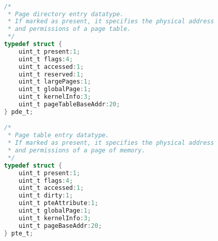 \documentclass[11pt]{article}
\begin{document}
\begin{lstlisting}[language=c]

/*
 * Page directory entry datatype.
 * If marked as present, it specifies the physical address
 * and permissions of a page table.
 */
typedef struct {
    uint_t present:1;
    uint_t flags:4;
    uint_t accessed:1;
    uint_t reserved:1;
    uint_t largePages:1;
    uint_t globalPage:1;
    uint_t kernelInfo:3;
    uint_t pageTableBaseAddr:20;
} pde_t;

/*
 * Page table entry datatype.
 * If marked as present, it specifies the physical address
 * and permissions of a page of memory.
 */
typedef struct {
    uint_t present:1;
    uint_t flags:4;
    uint_t accessed:1;
    uint_t dirty:1;
    uint_t pteAttribute:1;
    uint_t globalPage:1;
    uint_t kernelInfo:3;
    uint_t pageBaseAddr:20;
} pte_t;


\end{lstlisting}

\end{document}
